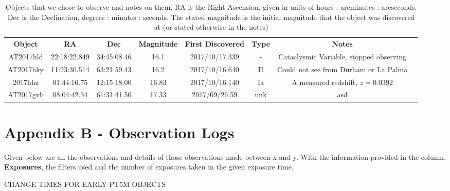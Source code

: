 \documentclass[twocolumn]{revtex4}
\begin{document}
{\renewcommand{\arraystretch}{1.2}%
\begin{table}[h!]
\centering    
\begin{tabularx}{\textwidth}{c@{\hskip 5pt} c c@{\hskip 5pt} c@{\hskip 5pt} c@{\hskip 5pt} c@{\hskip 5pt} c@{\hskip 5pt} X}
    \hline
    \textbf{Object} & \textbf{RA} & \textbf{Dec} & \textbf{Magnitude} &\textbf{First Discovered} &\textbf{Type} & \textbf{Notes} \\ 
    AT2017hld & 22:18:22.849 & 34:45:08.46 & 16.1 & 2017/10/17.339 & - & {Cataclysmic Variable, stopped observing}  \\
    AT2017hky & 11:23:30.514 & 63:21:59.43 & 16.2 & 2017/10/16.640 & II & {Could not see from Durham or La Palma}  \\
    2017hhz & 01:44:16.75 & 12:15:18.00 & 16.83 & 2017/10/16.140 & Ia & {A measured redshift, $z=0.0392$}  \\
    AT2017gvb & 08:04:42.34 & 61:31:41.50 & 17.33 & 2017/09/26.59 & unk & {asd}  \\

    \hline      
\end{tabularx}
\caption{Objects that we chose to observe and notes on them. RA is the Right Ascension, given in units of hours : arcminutes : arcseconds. Dec is the Declination, degrees : minutes : seconds. The stated magnitude is the initial magnitude that the object was discovered at (or stated otherwise in the notes)}
\label{objects}
\end{table}


\clearpage

\onecolumngrid
\vspace{-3ex}
\section*{Appendix B - Observation Logs} \label{obslogs}
\vspace{-2ex}
Given below are all the observations and details of those observations made between x and y. With the information provided in the column, \textbf{Exposures}, the filters used and the number of exposures taken in the given exposure time.

CHANGE TIMES FOR EARLY PT5M OBJECTS

}
\end{document}
